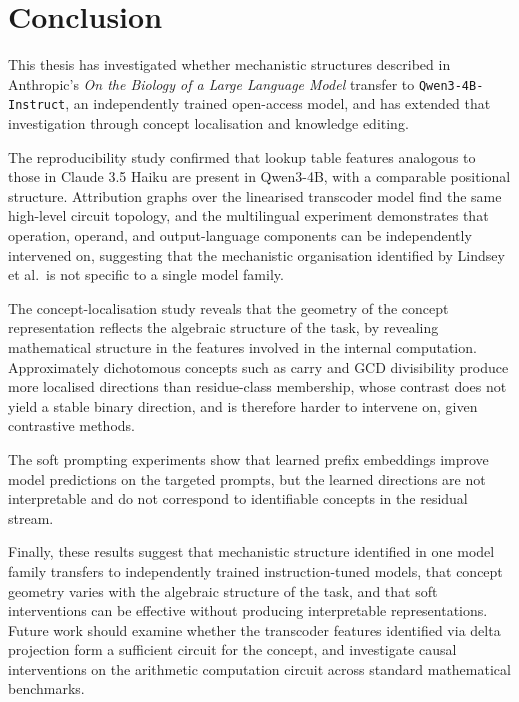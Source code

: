 \chapter{Conclusion}
\label{sec:conclusion}

This thesis has investigated whether mechanistic structures described
in Anthropic's \textit{On the Biology of a Large Language Model}
transfer to \texttt{Qwen3-4B-Instruct}, an independently trained
open-access model, and has extended that investigation through
concept localisation and knowledge editing.

The reproducibility study confirmed that lookup
table features analogous to those in Claude 3.5 Haiku are present
in Qwen3-4B, with a comparable positional structure.
Attribution graphs over the linearised transcoder model find
the same high-level circuit topology, and the multilingual experiment
demonstrates that operation, operand, and output-language components
can be independently intervened on, suggesting that the mechanistic
organisation identified by Lindsey et al.\ is not specific to a
single model family.

The concept-localisation study reveals that the geometry of the concept representation
 reflects the algebraic structure of the task, by revealing mathematical 
 structure in the features involved in the internal computation. 
 Approximately dichotomous concepts such as carry and GCD
divisibility produce more localised directions than
residue-class membership, whose contrast does not yield a stable binary
direction, and is therefore harder to intervene on, given contrastive methods.

The soft prompting experiments show that learned prefix embeddings
improve model predictions on the targeted prompts, but the learned
directions are not interpretable and do not correspond to identifiable
concepts in the residual stream.

Finally, these results suggest that mechanistic structure identified
in one model family transfers to independently trained instruction-tuned
models, that concept geometry varies with the algebraic structure of the
task, and that soft interventions can be effective without producing
interpretable representations. Future work should examine whether the
transcoder features identified via delta projection form a sufficient
circuit for the concept, and investigate causal interventions on the
arithmetic computation circuit across standard mathematical benchmarks.
